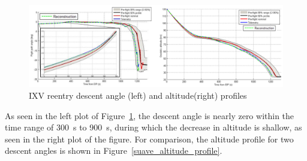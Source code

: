 \documentclass[%
 aip,
 amsmath,amssymb,
preprint,%
]{revtex4-1}
\begin{document}
\begin{figure}[h!]
\centering
\includegraphics[width=1\linewidth]{descent_altitude.png}
\caption{IXV reentry descent angle (left) and altitude(right) profiles \cite{bonetti2019ixv}}
\label{descent_altitude}
\end{figure}

As seen in the left plot of Figure~\ref{descent_altitude}, the descent angle is nearly zero within the time range of 300~s to 900~s, during which the decrease in altitude is shallow, as seen in the right plot of the figure. For comparison, the altitude profile for two descent angles is shown in Figure~\ref{suave_altitude_profile}.
\end{document}
